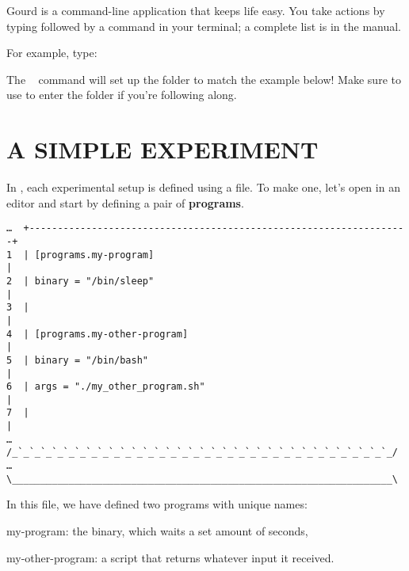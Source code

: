 \documentclass[a4paper,english]{article}
\begin{document}
\begin{adjustwidth}{18pt}{0pt}
    Gourd is a command-line application that keeps life easy.
    You take actions by typing  followed by a command in your terminal;
    a complete list is in the manual.

    For example, type:
    ~~~~

    The ~ command will set up the  folder to match
    the example below!
    Make sure to use  to enter the folder if you're following along.


    \section{A SIMPLE EXPERIMENT}

    In , each experimental setup is defined using a  file.
    To make one, let's open  in an editor and start by defining a pair
    of \textbf{programs}.

    \begin{verbatim}
…  +-------------------------------------------------------------------+
1  | [programs.my-program]                                             |
2  | binary = "/bin/sleep"                                             |
3  |                                                                   |
4  | [programs.my-other-program]                                       |
5  | binary = "/bin/bash"                                              |
6  | args = "./my_other_program.sh"                                    |
7  |                                                                   |
…  /_`_`_`_`_`_`_`_`_`_`_`_`_`_`_`_`_`_`_`_`_`_`_`_`_`_`_`_`_`_`_`_`_`_/
…  \___________________________________________________________________\
    \end{verbatim}

    In this file, we have defined two programs with unique names:
    \begin{Description}[programs]\setlength{\itemsep}{0cm}
    \item[my-program:] the  binary, which waits a set amount of seconds,
    \item[my-other-program:] a \File{bash} script that returns whatever input it received.
    \end{Description}





\end{adjustwidth}
\end{document}
